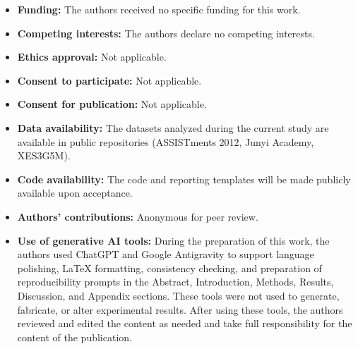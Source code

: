 \documentclass[sn-mathphys]{sn-jnl}
\begin{document}
\begin{itemize}
    \item \textbf{Funding:} The authors received no specific funding for this work.
    \item \textbf{Competing interests:} The authors declare no competing interests.
    \item \textbf{Ethics approval:} Not applicable.
    \item \textbf{Consent to participate:} Not applicable.
    \item \textbf{Consent for publication:} Not applicable.
    \item \textbf{Data availability:} The datasets analyzed during the current study are available in public repositories (ASSISTments 2012, Junyi Academy, XES3G5M).
    \item \textbf{Code availability:} The code and reporting templates will be made publicly available upon acceptance.
    \item \textbf{Authors' contributions:} Anonymous for peer review.
    \item \textbf{Use of generative AI tools:} During the preparation of this work, the authors used ChatGPT and Google Antigravity to support language polishing, LaTeX formatting, consistency checking, and preparation of reproducibility prompts in the Abstract, Introduction, Methods, Results, Discussion, and Appendix sections. These tools were not used to generate, fabricate, or alter experimental results. After using these tools, the authors reviewed and edited the content as needed and take full responsibility for the content of the publication.
\end{itemize}

\clearpage
\begin{appendices}

\end{appendices}


\end{document}
